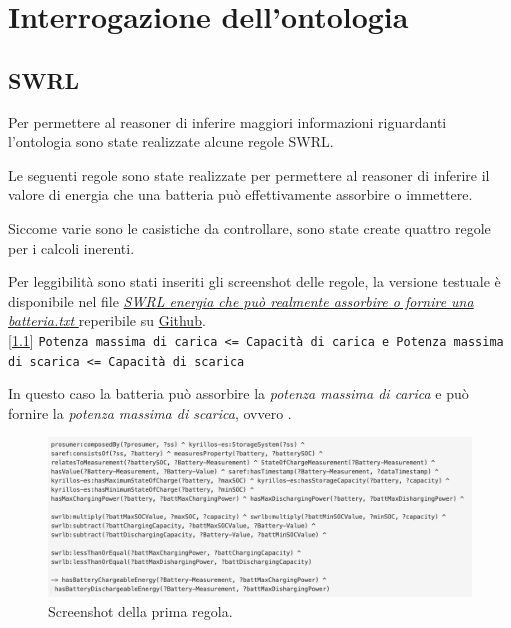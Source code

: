 \chapter{Interrogazione dell'ontologia}

\section{SWRL}
Per permettere al reasoner di inferire maggiori informazioni riguardanti l'ontologia sono state realizzate alcune regole SWRL.

Le seguenti regole sono state realizzate per permettere al reasoner di inferire il valore di energia che una batteria può effettivamente assorbire o immettere.

Siccome varie sono le casistiche da controllare, sono state create quattro regole per i calcoli inerenti.

Per leggibilità sono stati inseriti gli screenshot delle regole, la versione testuale è disponibile nel file \href{https://github.com/19eddie/SemanticWeb-Assignment02-03/blob/main/SWRL%20energia%20che%20pu%C3%B2%20realmente%20assorbire%20o%20fornire%20una%20batteria.txt}{\textit{SWRL energia che può realmente assorbire o fornire una batteria.txt}
} reperibile su \href{https://github.com/19eddie/SemanticWeb-Assignment02-03}{Github}. \\

[\ref*{fig:bothlessorequal}] \texttt{Potenza massima di carica <= Capacità di carica e
    Potenza massima di scarica <= Capacità di scarica}

In questo caso la batteria può assorbire la \textit{potenza massima di carica} e può fornire la \textit{potenza massima di scarica}, ovvero .

\begin{figure}[H]
    \centering
    \includegraphics[width=15cm]{images/both <=.png}
    \caption{Screenshot della prima regola.}
    \label{fig:bothlessorequal}
\end{figure}

